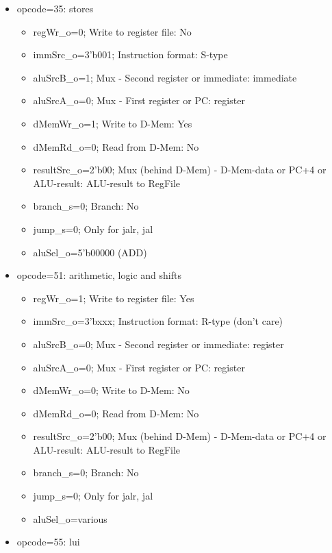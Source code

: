 \begin{itemize}
\begin{itemize}
\begin{itemize}
\begin{itemize}
        \item aluSel\_o=various
      \end{itemize}
      \item opcode=35: stores
      \begin{itemize}
        \item regWr\_o=0; Write to register file: No
        \item immSrc\_o=3'b001; Instruction format: S-type
        \item aluSrcB\_o=1; Mux - Second register or immediate: immediate
        \item aluSrcA\_o=0; Mux - First register or PC: register
        \item dMemWr\_o=1; Write to D-Mem: Yes
        \item dMemRd\_o=0; Read from D-Mem: No
        \item resultSrc\_o=2'b00; Mux (behind D-Mem) - D-Mem-data or PC+4 or ALU-result: ALU-result to RegFile
        \item branch\_s=0; Branch: No
        \item jump\_s=0; Only for jalr, jal
        \item aluSel\_o=5'b00000 (ADD)
      \end{itemize}
      \item opcode=51: arithmetic, logic and shifts
      \begin{itemize}
        \item regWr\_o=1; Write to register file: Yes
        \item immSrc\_o=3'bxxx; Instruction format: R-type (don't care)
        \item aluSrcB\_o=0; Mux - Second register or immediate: register
        \item aluSrcA\_o=0; Mux - First register or PC: register
        \item dMemWr\_o=0; Write to D-Mem: No
        \item dMemRd\_o=0; Read from D-Mem: No
        \item resultSrc\_o=2'b00; Mux (behind D-Mem) - D-Mem-data or PC+4 or ALU-result: ALU-result to RegFile
        \item branch\_s=0; Branch: No
        \item jump\_s=0; Only for jalr, jal
        \item aluSel\_o=various
      \end{itemize}
      \item opcode=55: lui
      \begin{itemize}

\end{itemize}
\end{itemize}
\end{itemize}
\end{itemize}
